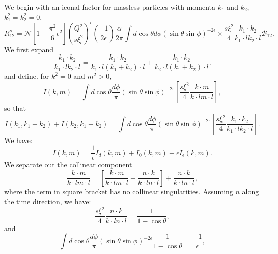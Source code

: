 \documentclass{letter}
\begin{document}
We begin with an iconal factor for massless particles with momenta $k_1$ and
$k_2$, $k_1^2 = k_2^2 = 0$,
\begin{equation}
  R^s_{12} = \mathcal{N}  \left[ 1 - \frac{\pi^2}{6} \epsilon^2 \right] \left(
  \frac{Q^2}{s \xi_c^2} \right)^{\epsilon} \left( \frac{- 1}{2 \epsilon}
  \right) \frac{\alpha}{2 \pi} \int d \cos \theta d \phi (\sin \theta \sin
  \phi)^{- 2 \epsilon} \times \frac{s \xi^2 }{4} \frac{k_1 \cdot k_2}{k_1
  \cdot l k_2 \cdot l}  \mathcal{B}_{12} .
\end{equation}
We first expand
\begin{equation}
  \frac{k_1 \cdot k_2}{k_1 \cdot l k_2 \cdot l} = \frac{k_1 \cdot k_2}{k_1
  \cdot l (k_1 + k_2) \cdot l} + \frac{k_1 \cdot k_2}{k_2 \cdot l (k_1 + k_2)
  \cdot l} .
\end{equation}
and define. for $k^2 = 0$ and $m^2 > 0$,
\begin{equation}
  I (k, m) = \int d \cos \theta \frac{d \phi}{\pi} (\sin \theta \sin \phi)^{-
  2 \epsilon}  \left[ \frac{s \xi^2}{4} \frac{k \cdot m}{k \cdot l m \cdot l}
  \right],
\end{equation}
so that
\begin{equation}
  I (k_1, k_1 + k_2) + I (k_2, k_1 + k_2) = \int d \cos \theta \frac{d
  \phi}{\pi} (\sin \theta \sin \phi)^{- 2 \epsilon}  \left[ \frac{s \xi^2}{4}
  \frac{k_1 \cdot k_2}{k_1 \cdot l k_2 \cdot l} \right] .
\end{equation}
We have:
\begin{equation}
  I (k, m) = \frac{1}{\epsilon} I_d (k, m) + I_0 (k, m) + \epsilon
  I_{\epsilon} (k, m) .
\end{equation}
We separate out the collinear component
\begin{equation}
  \frac{k \cdot m}{k \cdot l m \cdot l} = \left[ \frac{k \cdot m}{k \cdot l m
  \cdot l} - \frac{n \cdot k}{k \cdot l n \cdot l} \right] + \frac{n \cdot
  k}{k \cdot l n \cdot l},
\end{equation}
where the term in square bracket has no collinear singularities. Assuming $n$
along the time direction, we have:
\begin{equation}
  \frac{s \xi^2}{4}  \frac{n \cdot k}{k \cdot l n \cdot l} = \frac{1}{1 - \cos
  \theta},
\end{equation}
and
\begin{equation}
  \int d \cos \theta \frac{d \phi}{\pi} (\sin \theta \sin \phi)^{- 2 \epsilon}
  \frac{1}{1 - \cos \theta} = \frac{- 1}{\epsilon},
\end{equation}
\end{document}

